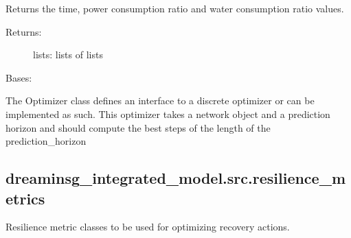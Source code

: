 \documentclass[letterpaper,10pt,english]{sphinxmanual}
\begin{document}
\begin{fulllineitems}

\begin{fulllineitems}
\label{\detokenize{apidoc:dreaminsg_integrated_model.src.optimizer.BruteForceOptimizer.get_trackers}}
\sphinxAtStartPar
Returns the time, power consumption ratio and water consumption ratio values.
\begin{description}
\item[{Returns:}] \leavevmode
\sphinxAtStartPar
lists: lists of lists

\end{description}

\end{fulllineitems}


\end{fulllineitems}


\begin{fulllineitems}
\label{\detokenize{apidoc:dreaminsg_integrated_model.src.optimizer.Optimizer}}
\sphinxAtStartPar
Bases: 

\sphinxAtStartPar
The Optimizer class defines an interface to a discrete optimizer or can be implemented as such. This optimizer takes a network object and a prediction horizon and should compute the best steps of the length of the prediction\_horizon

\end{fulllineitems}



\subsection{dreaminsg\_integrated\_model.src.resilience\_metrics}
\label{\detokenize{apidoc:module-dreaminsg_integrated_model.src.resilience_metrics}}\label{\detokenize{apidoc:dreaminsg-integrated-model-src-resilience-metrics}}
\sphinxAtStartPar
Resilience metric classes to be used for optimizing recovery actions.
\end{document}
